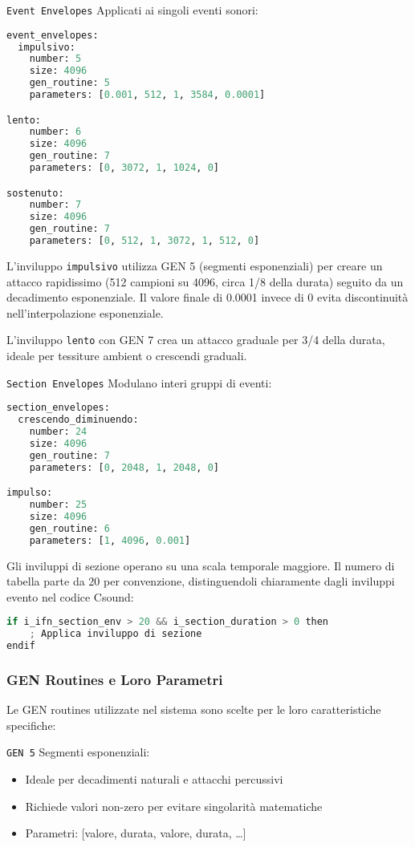 \texttt{Event Envelopes} Applicati ai singoli eventi sonori:

\begin{lstlisting}[language=Python]
event_envelopes:
  impulsivo:
    number: 5
    size: 4096
    gen_routine: 5
    parameters: [0.001, 512, 1, 3584, 0.0001]

lento:
    number: 6
    size: 4096
    gen_routine: 7
    parameters: [0, 3072, 1, 1024, 0]

sostenuto:
    number: 7
    size: 4096
    gen_routine: 7
    parameters: [0, 512, 1, 3072, 1, 512, 0]
\end{lstlisting}

L'inviluppo \texttt{impulsivo} utilizza GEN 5 (segmenti esponenziali) per creare un attacco rapidissimo (512 campioni su 4096, circa 1/8 della durata) seguito da un decadimento esponenziale. Il valore finale di 0.0001 invece di 0 evita discontinuità nell'interpolazione esponenziale.

L'inviluppo \texttt{lento} con GEN 7 crea un attacco graduale per 3/4 della durata, ideale per tessiture ambient o crescendi graduali.

\texttt{Section Envelopes} Modulano interi gruppi di eventi:

\begin{lstlisting}[language=Python]
section_envelopes:
  crescendo_diminuendo:
    number: 24
    size: 4096
    gen_routine: 7
    parameters: [0, 2048, 1, 2048, 0]

impulso:
    number: 25
    size: 4096
    gen_routine: 6
    parameters: [1, 4096, 0.001]
\end{lstlisting}

Gli inviluppi di sezione operano su una scala temporale maggiore. Il numero di tabella parte da 20 per convenzione, distinguendoli chiaramente dagli inviluppi evento nel codice Csound:

\begin{lstlisting}[language=C]
if i_ifn_section_env > 20 && i_section_duration > 0 then
    ; Applica inviluppo di sezione
endif
\end{lstlisting}
\subsubsection{GEN Routines e Loro Parametri}
Le GEN routines utilizzate nel sistema sono scelte per le loro caratteristiche specifiche:

\texttt{GEN 5} Segmenti esponenziali:
\begin{itemize}
    \item Ideale per decadimenti naturali e attacchi percussivi
    \item Richiede valori non-zero per evitare singolarità matematiche
    \item Parametri: [valore, durata, valore, durata, \ldots]
\end{itemize}


